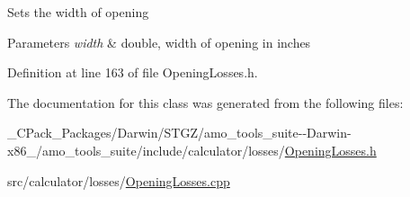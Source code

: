 Sets the width of opening 
\begin{DoxyParams}{Parameters}
{\em width} & double, width of opening in inches \\
\hline
\end{DoxyParams}


Definition at line 163 of file Opening\+Losses.\+h.



The documentation for this class was generated from the following files\+:\begin{DoxyCompactItemize}
\item 
\+\_\+\+C\+Pack\+\_\+\+Packages/\+Darwin/\+S\+T\+G\+Z/amo\+\_\+tools\+\_\+suite-\/-\/\+Darwin-\/x86\+\_/amo\+\_\+tools\+\_\+suite/include/calculator/losses/\hyperlink{___c_pack___packages_2_darwin_2_s_t_g_z_2amo__tools__suite--_darwin-x86__64_2amo__tools__suite_2d71043f6c6a078ed35d9feac98503cfb}{Opening\+Losses.\+h}\item 
src/calculator/losses/\hyperlink{_opening_losses_8cpp}{Opening\+Losses.\+cpp}\end{DoxyCompactItemize}
